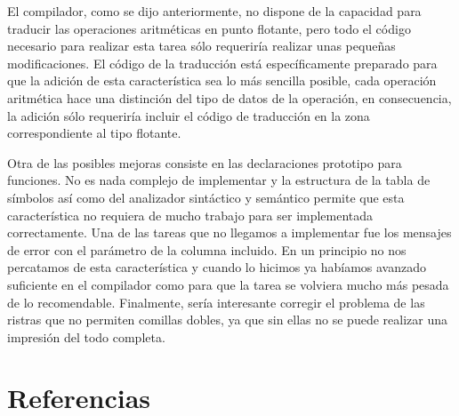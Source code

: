 \documentclass[a4paper,10pt]{article}
\begin{document}
El compilador, como se dijo anteriormente, no dispone de la capacidad para traducir las operaciones aritméticas en punto flotante, pero todo el código necesario para realizar esta tarea sólo requeriría realizar unas pequeñas modificaciones. El código de la traducción está específicamente preparado para que la adición de esta característica sea lo más sencilla posible, cada operación aritmética hace una distinción del tipo de datos de la operación, en consecuencia, la adición sólo requeriría incluir el código de traducción en la zona correspondiente al tipo flotante.

Otra de las posibles mejoras consiste en las declaraciones prototipo para funciones. No es nada complejo de implementar y la estructura de la tabla de símbolos así como del analizador sintáctico y semántico permite que esta característica no requiera de mucho trabajo para ser implementada correctamente.
Una de las tareas que no llegamos a implementar fue los mensajes de error con el parámetro de la columna incluido. En un principio no nos percatamos de esta característica y cuando lo hicimos ya habíamos avanzado suficiente en el compilador como para que la tarea se volviera mucho más pesada de lo recomendable.
Finalmente, sería interesante corregir el problema de las ristras que no permiten comillas dobles, ya que sin ellas no se puede realizar una impresión del todo completa.

\section{Referencias}
\end{document}

